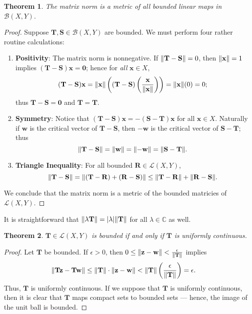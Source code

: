 \documentclass[11pt]{article}
\newtheorem{theorem}{Theorem}
\renewcommand{\vec}[1]{\mathbf{#1}}
\newcommand{\mat}[1]{\mathbf{#1}}
\begin{document}
\begin{theorem}
  The matrix norm is a metric of all bounded linear maps in $\mathcal{B}(X, Y)$.
\end{theorem}
\begin{adjustwidth}{0.5cm}{}
	\begin{proof}
		Suppose $\mat{T}, \mat{S} \in \mathcal{B}(X, Y)$ are bounded. We must perform four rather routine calculations:
		\begin{enumerate}
			\item \textbf{Positivity}: The matrix norm is nonnegative. If $\norm{\mat{T} - \mat{S}} = 0$, then $\norm{\vec{x}} = 1$ implies $(\mat{T} - \mat{S}) \vec{x} = \vec{0}$; hence for \textit{all} $\vec{x} \in X$,
			\[
				(\mat{T} - \mat{S}) \vec{x} = \norm{\vec{x}} \left( (\mat{T} - \mat{S}) \left( \frac{\vec{\vec{x}}}{\norm{\vec{x}}} \right) \right) = \norm{\vec{x}} (0) = 0;
			\]	
			thus $\mat{T} - \mat{S} = \mat{0}$ and $\mat{T} = \mat{T}$.
			\item \textbf{Symmetry}: Notice that $(\mat{T} - \mat{S}) \vec{x} = - (\mat{S} - \mat{T}) \vec{x}$ for all $\vec{x} \in X$. Naturally if $\vec{w}$ is the critical vector of $\mat{T} - \mat{S}$, then $- \vec{w}$ is the critical vector of $\mat{S} - \mat{T}$; thus
			\[
				\norm{\mat{T} - \mat{S}} = \norm{\vec{w}} = \norm{-\vec{w}} = \norm{\mat{S} - \mat{T}}.
			\]	
			\item \textbf{Triangle Inequality}: For all bounded $\mat{R} \in \mathcal{L}(X, Y)$,
			\[
				\norm{\mat{T - S}} = \norm{\mat{(T - R) + (R - S)}} \le \norm{\mat{T - R}} + \norm{\mat{R - S}}.
			\]
		\end{enumerate}
		We conclude that the matrix norm is a metric of the bounded matricies of $\mathcal{L}(X, Y)$.
	\end{proof}
\end{adjustwidth}

It is straightforward that $\norm{\lambda \mat{T}} = \abs{\lambda} \norm{\mat{T}}$ for all $\lambda \in \mathbb{C}$ as well.

\newpage

\begin{theorem}
	$\mat{T} \in \mathcal{L}(X, Y)$ is bounded if and only if $\mat{T}$ is uniformly continuous.
\end{theorem}
\begin{adjustwidth}{0.5cm}{}
  \begin{proof}
    Let $\mat{T}$ be bounded. If $\epsilon > 0$, then $0 \le \norm{\vec{z} - \vec{w}} < \tfrac{\epsilon}{\norm{\mat{T}}}$ implies
		\begin{align*}
			\norm{\mat{T} \vec{z} - \mat{T} \vec{w}} &\le \norm{\mat{T}} \cdot \norm{\vec{z} - \vec{w}} < \norm{\mat{T}} \left( \frac{\epsilon}{\norm{\mat{T}}} \right) = \epsilon.
		\end{align*}
		Thus, $\mat{T}$ is uniformly continuous. If we suppose that $\mat{T}$ is uniformly continuous, then it is clear that $\mat{T}$ maps compact sets to bounded sets --- hence, the image of the unit ball is bounded.
	\end{proof}
\end{adjustwidth}
\end{document}
